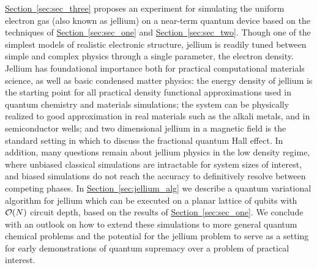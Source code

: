 \documentclass[superscriptaddress,aps,pra,nofootinbib,notitlepage,10pt,longbibliography]{revtex4-1}
\renewcommand{\sec}[1]{\hyperref[sec:#1]{Section~\ref*{sec:#1}}}
\begin{document}
\sec{sec_three} proposes an experiment for simulating the uniform electron gas (also known as jellium) on a near-term quantum device based on the techniques of \sec{sec_one} and \sec{sec_two}. Though one of the simplest models of realistic electronic structure, jellium is readily tuned between simple and complex physics through a single parameter, the electron density. Jellium has foundational importance both for practical computational materials science, as well as basic condensed matter physics:
the energy density of jellium is the starting point for all practical density functional approximations used in 
quantum chemistry and materials simulations; the system can be physically realized to good approximation in real materials such as the alkali metals,
and in semiconductor wells; and two dimensional jellium in a magnetic field is the standard setting in which to discuss the fractional quantum Hall effect. In addition, many questions remain about jellium physics in the low  density regime, where
unbiased classical simulations are intractable for system sizes of interest, and biased simulations do not reach the
accuracy to definitively resolve between competing phases.
In \sec{jellium_alg} we describe a quantum variational algorithm for jellium which can be executed on a planar lattice of qubits with ${\cal O}(N)$ circuit depth, based on the results of \sec{sec_one}. We conclude with an outlook on how to extend these simulations to more general quantum chemical problems and the potential for the jellium problem to serve as a setting for early demonstrations of quantum supremacy over a problem of practical interest.
\end{document}
